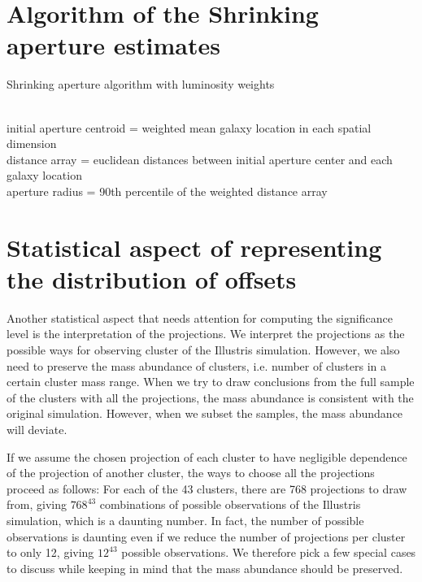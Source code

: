 \section{Algorithm of the Shrinking aperture estimates}
\label{app:shrink_apert}
\begin{algorithm}
	\caption{Shrinking aperture algorithm with luminosity weights}
	 \hrulefill \\

	 initial aperture centroid = weighted mean galaxy location in each spatial dimension\\
 	distance array = euclidean distances between initial aperture center and each galaxy
	location \\
 	aperture radius = 90th percentile of the weighted distance array\\ 
	   \hrulefill
\end{algorithm}
\section{Statistical aspect of representing the distribution of offsets}

Another statistical aspect that needs attention for computing the
significance level is the interpretation of the 
projections. 
We interpret the projections as the possible ways for observing 
cluster of the Illustris simulation. 
However, we also need to preserve the mass abundance of clusters, i.e. number
of clusters in a certain cluster mass range. 
When we try to draw conclusions from the full sample of the clusters with all
the projections, the mass abundance is consistent with the original simulation. 
However, when we subset the samples, the mass abundance will deviate.  

If we assume the chosen projection of each cluster 
to have negligible dependence of the projection of another cluster, the ways to
choose all the projections proceed as follows:
For each of the 43 clusters, there are 768 projections to draw from, 
giving $768^{43}$ combinations of possible observations of the 
Illustris simulation, which is a daunting number. In fact, the number of
possible observations is daunting even
if we reduce the number of projections per cluster to only 12, giving $12^{43}$
possible observations. 
We therefore pick a few special cases to discuss while keeping in mind that  
the mass abundance should be preserved. 

